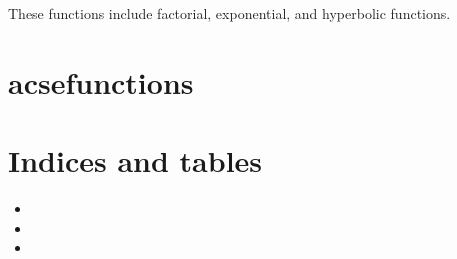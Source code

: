 \documentclass[a4paper,10pt,oneside,english]{sphinxmanual}
\begin{document}
\sphinxAtStartPar
These functions include factorial, exponential, and hyperbolic functions.

\sphinxstepscope


\chapter{acsefunctions}
\label{\detokenize{modules:acsefunctions}}\label{\detokenize{modules::doc}}

\chapter{Indices and tables}
\label{\detokenize{index:indices-and-tables}}\begin{itemize}
\item {} 
\sphinxAtStartPar
{}

\item {} 
\sphinxAtStartPar
{}

\item {} 
\sphinxAtStartPar
{}

\end{itemize}


\renewcommand{\indexname}{Python Module Index}
\begin{sphinxtheindex}
\let\bigletter\sphinxstyleindexlettergroup
\bigletter{a}
\item\relax{}
\item\relax{}
\end{sphinxtheindex}

\renewcommand{\indexname}{Index}
\printindex
\end{document}
